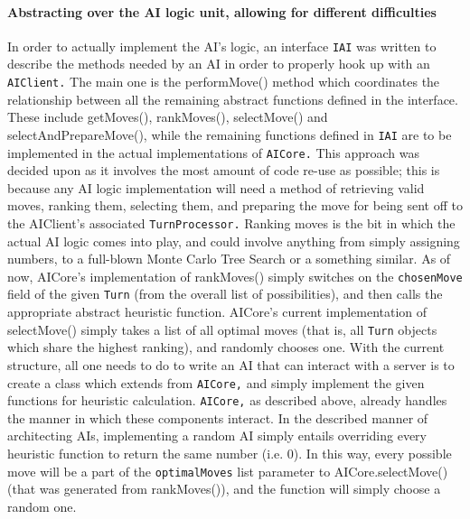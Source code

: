\documentclass[a4paper,doc]{apa6}
\newcommand{\code}{\texttt}
\begin{document}
\paragraph{Abstracting over the AI logic unit, allowing for different difficulties}
In order to actually implement the AI’s logic, an interface \code{IAI} was written to describe the methods needed by an AI in order to properly hook up with an \code{AIClient.} The main one is the performMove() method which coordinates the relationship between all the remaining abstract functions defined in the interface. These include getMoves(), rankMoves(), selectMove() and selectAndPrepareMove(), while the remaining functions defined in \code{IAI} are to be implemented in the actual implementations of \code{AICore.} This approach was decided upon as it involves the most amount of code re-use as possible; this is because any AI logic implementation will need a method of retrieving valid moves, ranking them, selecting them, and preparing the move for being sent off to the AIClient’s associated \code{TurnProcessor.} Ranking moves is the bit in which the actual AI logic comes into play, and could involve anything from simply assigning numbers, to a full-blown Monte Carlo Tree Search or a something similar. As of now, AICore’s implementation of rankMoves() simply switches on the \code{chosenMove} field of the given \code{Turn}  (from the overall list of possibilities), and then calls the appropriate abstract heuristic function. AICore’s current implementation of selectMove() simply takes a list of all optimal moves (that is, all \code{Turn} objects which share the highest ranking), and randomly chooses one. With the current structure, all one needs to do to write an AI that can interact with a server is to create a class which extends from \code{AICore,} and simply implement the given functions for heuristic calculation. \code{AICore,} as described above, already handles the manner in which these components interact. In the described manner of architecting AIs, implementing a random AI simply entails overriding every heuristic function to return the same number (i.e. 0). In this way, every possible move will be a part of the \code{optimalMoves} list parameter to AICore.selectMove() (that was generated from rankMoves()), and the function will simply choose a random one.
\end{document}
